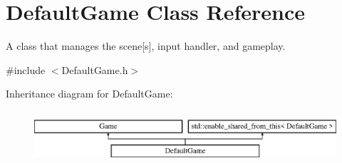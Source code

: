 \hypertarget{class_default_game}{}\section{Default\+Game Class Reference}
\label{class_default_game}


A class that manages the scene\mbox{[}s\mbox{]}, input handler, and gameplay.  




{\ttfamily \#include $<$Default\+Game.\+h$>$}

Inheritance diagram for Default\+Game\+:\begin{figure}[H]
\begin{center}
\leavevmode
\includegraphics[height=2.000000cm]{class_default_game}
\end{center}
\end{figure}
